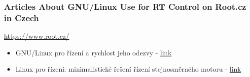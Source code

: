 \documentclass{beamer}
\begin{document}
\begin{frame}
\frametitle{Articles About GNU/Linux Use for RT Control on Root.cz in Czech}

\href{https://www.root.cz/}{https://www.root.cz/}

\begin{itemize}
\item
  GNU/Linux pro řízení a rychlost jeho odezvy -
  \href{https://www.root.cz/clanky/gnu-linux-pro-rizeni-a-rychlost-jeho-odezvy/}{link}
\item
  Linux pro řízení: minimalistické řešení řízení stejnosměrného mo­toru
  -
  \href{https://www.root.cz/clanky/linux-pro-rizeni-minimalisticke-reseni-rizeni-stejnosmerneho-motoru/}{link}
\end{itemize}

\end{frame}
\end{document}
